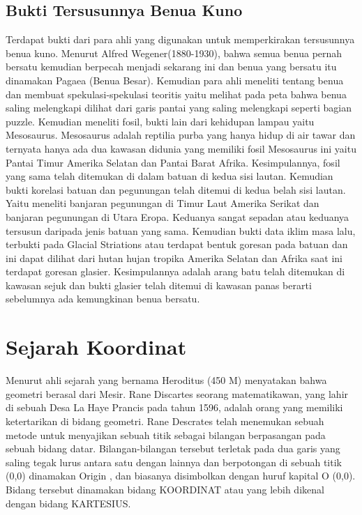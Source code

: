 \subsection{Bukti Tersusunnya Benua Kuno}
Terdapat bukti dari para ahli yang digunakan untuk memperkirakan tersusunnya benua kuno.
Menurut Alfred Wegener(1880-1930), bahwa semua benua pernah bersatu kemudian berpecah menjadi sekarang ini dan benua yang bersatu itu dinamakan Pagaea (Benua Besar)\cite{hallam1975alfred}. Kemudian para ahli meneliti tentang benua dan membuat spekulasi-spekulasi teoritis yaitu melihat pada peta bahwa benua saling melengkapi dilihat dari garis pantai yang saling melengkapi seperti bagian puzzle. Kemudian meneliti fosil, bukti lain dari kehidupan lampau yaitu Mesosaurus. Mesosaurus adalah reptilia purba yang hanya hidup di air tawar dan ternyata hanya ada dua kawasan didunia yang memiliki fosil Mesosaurus ini yaitu Pantai Timur Amerika Selatan dan Pantai Barat Afrika. Kesimpulannya, fosil yang sama telah ditemukan di dalam batuan di kedua sisi lautan. Kemudian bukti korelasi batuan dan pegunungan telah ditemui di kedua belah sisi lautan. Yaitu meneliti banjaran pegunungan di Timur Laut Amerika Serikat dan banjaran pegunungan di Utara Eropa. Keduanya sangat sepadan atau keduanya tersusun daripada jenis batuan yang sama. Kemudian bukti data iklim masa lalu, terbukti pada Glacial Striations atau terdapat bentuk goresan pada batuan dan ini dapat dilihat dari hutan hujan tropika Amerika Selatan dan Afrika saat ini terdapat goresan glasier. Kesimpulannya adalah arang batu telah ditemukan di kawasan sejuk dan bukti glasier telah ditemui di kawasan panas berarti sebelumnya ada kemungkinan benua bersatu.

\section{Sejarah Koordinat}
Menurut ahli sejarah yang bernama Heroditus (450 M) menyatakan bahwa geometri berasal dari Mesir. Rane Discartes seorang matematikawan, yang lahir di sebuah Desa La Haye Prancis pada tahun 1596, adalah orang yang memiliki ketertarikan di bidang geometri. Rane Descrates telah menemukan sebuah metode untuk menyajikan sebuah titik sebagai bilangan berpasangan pada sebuah bidang datar. Bilangan-bilangan tersebut terletak pada dua garis yang saling tegak lurus antara satu dengan lainnya dan berpotongan di sebuah titik (0,0) dinamakan Origin , dan biasanya disimbolkan dengan huruf kapital O (0,0).
Bidang tersebut dinamakan bidang KOORDINAT atau yang lebih dikenal dengan bidang KARTESIUS.

